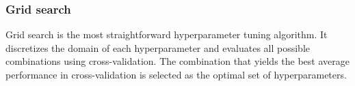 \subsubsection{Grid search}
Grid search is the most straightforward hyperparameter tuning algorithm. It discretizes the domain of each hyperparameter and evaluates all possible combinations using cross-validation. The combination that yields the best average performance in cross-validation is selected as the optimal set of hyperparameters.